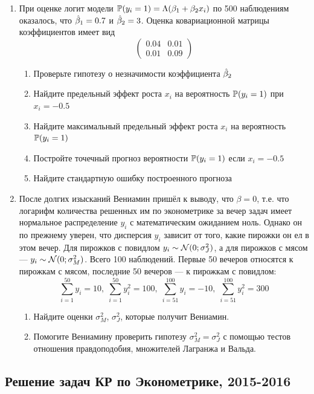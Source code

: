 \documentclass[12pt, a4paper]{article}\usepackage[]{graphicx}\usepackage[]{color}
\begin{document}
\begin{enumerate}
\item При оценке логит модели
\(
\P(y_i=1)=\Lambda(\b_1+\b_2 x_i)
\)
по 500 наблюдениям оказалось, что $\hb_1=0.7$ и $\hb_2=3$. Оценка ковариационной матрицы коэффициентов имеет вид
\[
\begin{pmatrix}
  0.04 & 0.01 \\
  0.01 & 0.09
\end{pmatrix}
\]

\begin{enumerate}
\item Проверьте гипотезу о незначимости коэффициента $\hb_2$
\item Найдите предельный эффект роста $x_i$ на вероятность $\P(y_i=1)$ при $x_i=-0.5$
\item Найдите максимальный предельный эффект роста $x_i$ на вероятность $\P(y_i=1)$
\item Постройте точечный прогноз вероятности $\P(y_i=1)$ если $x_i = -0.5$
\item Найдите стандартную ошибку построенного прогноза
\end{enumerate}

\item После долгих изысканий Вениамин пришёл к выводу, что $\beta=0$, т.е. что логарифм количества решенных им по эконометрике за вечер задач имеет нормальное распределение $y_i$ с математическим ожиданием ноль. Однако он по прежнему уверен, что дисперсия $y_i$ зависит от того, какие пирожки он ел в этом вечер. Для пирожков с повидлом $y_i \sim \cN(0;\sigma^2_J)$, а для пирожков с мясом — $y_i\sim \cN(0;\sigma^2_M)$. Всего 100 наблюдений. Первые 50 вечеров относятся к пирожкам с мясом, последние 50 вечеров — к пирожкам с повидлом:
\[
\sum_{i=1}^{50} y_i = 10, \; \sum_{i=1}^{50} y_i^2 = 100, \;
\sum_{i=51}^{100} y_i = -10, \; \sum_{i=51}^{100} y_i^2 = 300
\]
\begin{enumerate}
\item Найдите оценки $\sigma^2_M$, $\sigma^2_J$, которые получит Вениамин.
\item Помогите Вениамину проверить гипотезу $\sigma^2_M = \sigma^2_J$ с помощью тестов отношения правдоподобия, множителей Лагранжа и Вальда.
\end{enumerate}

\end{enumerate}


\subsection{Решение задач КР по Эконометрике, 2015-2016}
\end{document}
